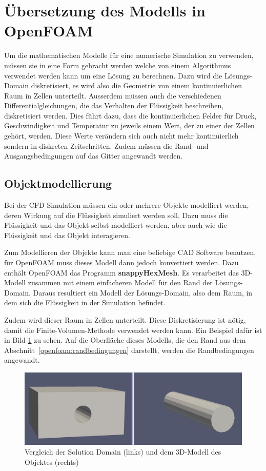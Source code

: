 \section{Übersetzung des Modells in OpenFOAM}
Um die mathematischen Modelle für eine numerische Simulation zu verwenden, müssen sie in eine Form gebracht werden welche von einem Algorithmus verwendet werden kann um eine Lösung zu berechnen.
Dazu wird die Lösungs-Domain diskretisiert, es wird also die Geometrie von einem kontinuierlichen Raum in Zellen unterteilt.
%
Ausserdem müssen auch die verschiedenen Differentialgleichungen, die das Verhalten der Flüssigkeit beschreiben, diskretisiert werden.
%
Dies führt dazu, dass die kontinuierlichen Felder für Druck, Geschwindigkeit und Temperatur zu jeweils einem Wert, der zu einer der Zellen gehört, werden.
Diese Werte verändern sich auch nicht mehr kontinuierlich sondern in diskreten Zeitschritten.
Zudem müssen die Rand- und Ausgangsbedingungen auf das Gitter angewandt werden.


\subsection{Objektmodellierung}
Bei der CFD Simulation müssen ein oder mehrere Objekte modelliert werden, deren Wirkung auf die Flüssigkeit simuliert werden soll. 
Dazu muss die Flüssigkeit und das Objekt selbst modelliert werden, aber auch wie die Flüssigkeit und das Objekt interagieren.

Zum Modellieren der Objekte kann man eine beliebige CAD Software benutzen, für OpenFOAM muss dieses Modell dann jedoch konvertiert werden.
Dazu enthält OpenFOAM das Programm \textbf{snappyHexMesh}.
%
Es verarbeitet das 3D-Modell zusammen mit einem einfacheren Modell für den Rand der Lösungs-Domain. 
Daraus resultiert ein Modell der Lösungs-Domain, also dem Raum, in dem sich die Flüssigkeit in der Simulation befindet.

Zudem wird dieser Raum in Zellen unterteilt.
Diese Diskretisierung ist nötig, damit die Finite-Volumen-Methode verwendet werden kann.
Ein Beispiel dafür ist in Bild \ref{openfoam:fig:SD_Modell_vergleich} zu sehen.
Auf die Oberfläche dieses Modells, die den Rand aus dem Abschnitt~\ref{openfoam:randbedingungen} darstellt, werden die Randbedingungen angewandt.
\begin{figure}
	\centering
	\includegraphics[scale=0.1]{papers/openfoam/Bilder/vergleich_solution_domain_object.png}
	\caption{Vergleich der Solution Domain (links) und dem 3D-Modell des Objektes (rechts)}
	\label{openfoam:fig:SD_Modell_vergleich}
\end{figure}

